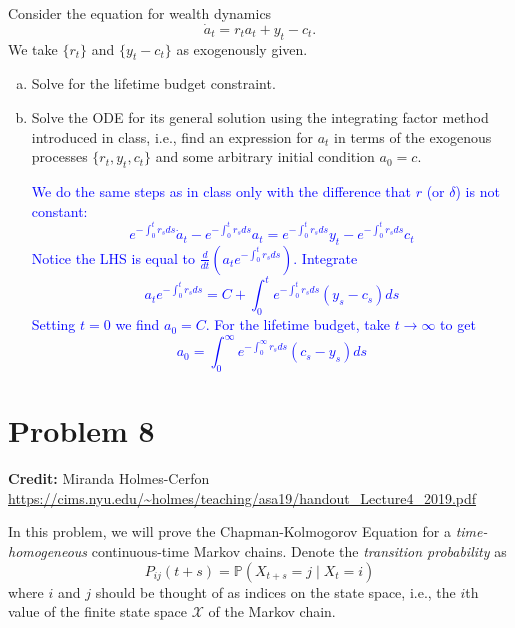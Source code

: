 \documentclass[11pt]{extarticle}
\theoremstyle{plain}
\theoremstyle{definition}
\begin{document}
Consider the equation for wealth dynamics
\begin{equation*}
	\dot a_t = r_t a_t + y_t - c_t.
\end{equation*}
We take $\{r_t\}$ and $\{y_t - c_t\}$ as exogenously given.

\begin{enumerate}[(a)]
\item Solve for the lifetime budget constraint.

\item Solve the ODE for its general solution using the integrating factor method introduced in class, i.e., find an expression for $a_t$ in terms of the exogenous processes $\{r_t, y_t, c_t\}$ and some arbitrary initial condition $a_0 = c$. 

\textcolor{blue}{We do the same steps as in class only with the difference that $r$ (or $\delta$) is not constant: $$e^{-\int_0^t r_s ds}\dot{a}_t
-e^{-\int_0^t r_s ds}a_t = e^{-\int_0^t r_s ds}y_t - e^{-\int_0^t r_s ds} c_t$$ Notice the LHS is equal to $\frac{d}{dt}(a_t e^{-\int_0^t r_s ds})$. Integrate $$a_t e^{-\int_0^t r_s ds} = C+\int_0^t e^{-\int_0^t r_s ds}(y_s-c_s)ds$$ Setting $t=0$ we find $a_0=C$. For the lifetime budget, take $t \rightarrow \infty$ to get $$ a_0= \int_0^\infty e^{-\int_0^\infty r_s ds}(c_s-y_s)ds$$}


\end{enumerate}


\vspace{10mm}
\section*{Problem 8}

\textbf{Credit:} Miranda Holmes-Cerfon \url{https://cims.nyu.edu/~holmes/teaching/asa19/handout_Lecture4_2019.pdf}

\vspace{5mm}
\noindent
In this problem, we will prove the Chapman-Kolmogorov Equation for a \textit{time-homogeneous} continuous-time Markov chains. Denote the \textit{transition probability} as
\begin{equation*}
	P_{ij}(t+s) = \mathbb P(X_{t+s} = j \mid X_t = i)
\end{equation*}
where $i$ and $j$ should be thought of as indices on the state space, i.e., the $i$th value of the finite state space $\mathcal X$ of the Markov chain.
\end{document}
